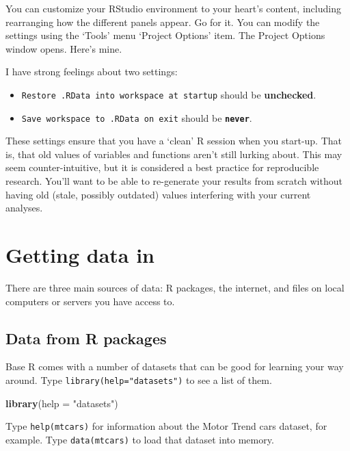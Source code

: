 \documentclass[]{article}
\newenvironment{Shaded}{\begin{snugshade}}{\end{snugshade}}
\newcommand{\KeywordTok}[1]{\textcolor[rgb]{0.13,0.29,0.53}{\textbf{#1}}}
\newcommand{\DataTypeTok}[1]{\textcolor[rgb]{0.13,0.29,0.53}{#1}}
\newcommand{\StringTok}[1]{\textcolor[rgb]{0.31,0.60,0.02}{#1}}
\newcommand{\NormalTok}[1]{#1}
\providecommand{\tightlist}{%
  \setlength{\itemsep}{0pt}\setlength{\parskip}{0pt}}
\begin{document}
You can customize your RStudio environment to your heart's content,
including rearranging how the different panels appear. Go for it. You
can modify the settings using the `Tools' menu `Project Options' item.
The Project Options window opens. Here's mine.

I have strong feelings about two settings:

\begin{itemize}
\tightlist
\item
  \texttt{Restore\ .RData\ into\ workspace\ at\ startup} should be
  \textbf{unchecked}.
\item
  \texttt{Save\ workspace\ to\ .RData\ on\ exit} should be
  \textbf{\texttt{never}}.
\end{itemize}

These settings ensure that you have a `clean' R session when you
start-up. That is, that old values of variables and functions aren't
still lurking about. This may seem counter-intuitive, but it is
considered a best practice for reproducible research. You'll want to be
able to re-generate your results from scratch without having old (stale,
possibly outdated) values interfering with your current analyses.

\section{Getting data in}\label{getting-data-in}

There are three main sources of data: R packages, the internet, and
files on local computers or servers you have access to.

\subsection{Data from R packages}\label{data-from-r-packages}

Base R comes with a number of datasets that can be good for learning
your way around. Type \texttt{library(help="datasets")} to see a list of
them.

\begin{Shaded}
\begin{Highlighting}[]
\KeywordTok{library}\NormalTok{(}\DataTypeTok{help =} \StringTok{"datasets"}\NormalTok{)}
\end{Highlighting}
\end{Shaded}

Type \texttt{help(\textquotesingle{}mtcars\textquotesingle{})} for
information about the Motor Trend cars dataset, for example. Type
\texttt{data(\textquotesingle{}mtcars\textquotesingle{})} to load that
dataset into memory.
\end{document}
